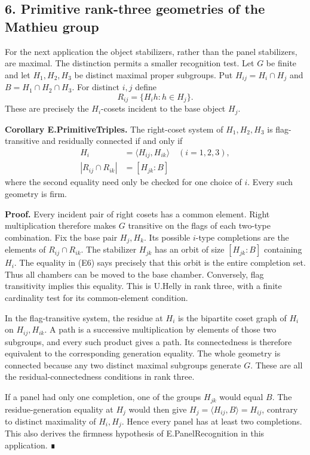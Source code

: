 \documentclass[
  11pt,
  a4paper,
]{article}
\begin{document}
\subsection{6. Primitive rank-three geometries of the Mathieu
group}\label{primitive-rank-three-geometries-of-the-mathieu-group}

For the next application the object stabilizers, rather than the panel
stabilizers, are maximal. The distinction permits a smaller recognition
test. Let \(G\) be finite and let \(H_1,H_2,H_3\) be distinct maximal
proper subgroups. Put \(H_{ij}=H_i\cap H_j\) and
\(B=H_1\cap H_2\cap H_3\). For distinct \(i,j\) define \[
R_{ij}=\{H_i h:h\in H_j\}.
\] These are precisely the \(H_i\)-cosets incident to the base object
\(H_j\).

\textbf{Corollary E.PrimitiveTriples.} The right-coset system of
\(H_1,H_2,H_3\) is flag-transitive and residually connected if and only
if \[
\begin{split}
H_i&=\langle H_{ij},H_{ik}\rangle\quad(i=1,2,3),\\
|R_{ij}\cap R_{ik}|&=[H_{jk}:B]
\end{split}\tag{E6}
\] where the second equality need only be checked for one choice of
\(i\). Every such geometry is firm.

\textbf{Proof.} Every incident pair of right cosets has a common
element. Right multiplication therefore makes \(G\) transitive on the
flags of each two-type combination. Fix the base pair \(H_j,H_k\). Its
possible \(i\)-type completions are the elements of
\(R_{ij}\cap R_{ik}\). The stabilizer \(H_{jk}\) has an orbit of size
\([H_{jk}:B]\) containing \(H_i\). The equality in (E6) says precisely
that this orbit is the entire completion set. Thus all chambers can be
moved to the base chamber. Conversely, flag transitivity implies this
equality. This is U.Helly in rank three, with a finite cardinality test
for its common-element condition.

In the flag-transitive system, the residue at \(H_i\) is the bipartite
coset graph of \(H_i\) on \(H_{ij},H_{ik}\). A path is a successive
multiplication by elements of those two subgroups, and every such
product gives a path. Its connectedness is therefore equivalent to the
corresponding generation equality. The whole geometry is connected
because any two distinct maximal subgroups generate \(G\). These are all
the residual-connectedness conditions in rank three.

If a panel had only one completion, one of the groups \(H_{jk}\) would
equal \(B\). The residue-generation equality at \(H_j\) would then give
\(H_j=\langle H_{ij},B\rangle=H_{ij}\), contrary to distinct maximality
of \(H_i,H_j\). Hence every panel has at least two completions. This
also derives the firmness hypothesis of E.PanelRecognition in this
application. ∎
\end{document}
